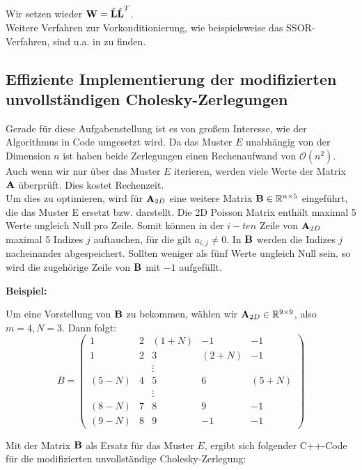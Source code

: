 Wir setzen wieder ${\textbf{W}} = \hat{{\textbf{L}}} \hat{{\textbf{L}}}^{T}$. \\

Weitere Verfahren zur Vorkonditionierung, wie beispielsweise das SSOR-Verfahren, sind u.a. in \cite{SAAD5} zu finden.

\subsection{Effiziente Implementierung der modifizierten unvollständigen Cholesky-Zerlegungen}

Gerade für diese Aufgabenstellung ist es von großem Interesse, wie der Algorithmus in Code umgesetzt wird. Da das Muster $E$ unabhängig von der Dimension $n$ ist haben beide Zerlegungen einen Rechenaufwand von $\mathcal{O}(n^{2})$. Auch wenn wir nur über das Muster $E$ iterieren, werden viele Werte der Matrix ${\textbf{A}}$ überprüft. Dies kostet Rechenzeit.\\
Um dies zu optimieren, wird für ${\textbf{A}}_{2D}$ eine weitere Matrix ${\textbf{B}} \in \mathbb{R}^{n \times 5}$ eingeführt, die das Muster E ersetzt bzw. darstellt. Die 2D Poisson Matrix enthält maximal 5 Werte ungleich Null pro Zeile. Somit können in der $i - ten$ Zeile von ${\textbf{A}}_{2D}$ maximal 5 Indizes $j$ auftauchen, für die gilt $a_{i,j} \ne 0$. In ${\textbf{B}}$ werden die Indizes $j$ nacheinander abgespeichert. Sollten weniger als fünf Werte ungleich Null sein, so wird die zugehörige Zeile von ${\textbf{B}}$ mit $-1$ aufgefüllt.

\textbf{Beispiel:}

Um eine Vorstellung von ${\textbf{B}}$ zu bekommen, wählen wir ${\textbf{A}}_{2D} \in \mathbb{R}^{9 \times 9}$, also $m = 4, N = 3$. Dann folgt:
\begin{equation}
B = 
\begin{pmatrix}
1 & 2 & (1+N) & -1 & -1\\
1 & 2 & 3 & (2+N) & -1\\
  &   & \vdots & &\\
(5-N) & 4 & 5 & 6 & (5+N)\\
  &   & \vdots & &\\
(8-N) & 7 & 8 & 9 & -1\\
(9-N) & 8 & 9 & -1 & -1
\end{pmatrix}
\end{equation}

Mit der Matrix ${\textbf{B}}$ als Ersatz für das Muster $E$, ergibt sich folgender C++-Code für die modifizierten unvollständige Cholesky-Zerlegung:

